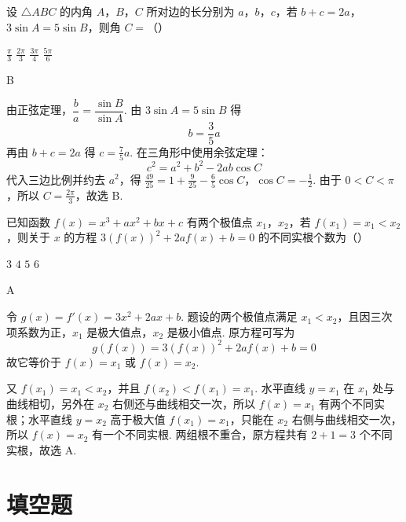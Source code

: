 \begin{problem}
设 \(\triangle ABC\) 的内角 \(A\)，\(B\)，\(C\) 所对边的长分别为 \(a\)，\(b\)，\(c\)，若 \(b + c = 2a\)，\(3\sin A = 5\sin B\)，则角 \(C =\)（\quad）

\choices
    {\( \frac{\pi}{3} \)}
    {\( \frac{2\pi}{3} \)}
    {\( \frac{3\pi}{4} \)}
    {\(\frac{5\pi}{6}\)}
\end{problem}

\begin{answer}
B
\end{answer}

\begin{solution}
由正弦定理，\(\dfrac{b}{a}=\dfrac{\sin B}{\sin A}\). 由 \(3\sin A=5\sin B\) 得
\[
b=\frac35a
\]
再由 \(b+c=2a\) 得 \(c=\frac75a\). 在三角形中使用余弦定理：
\[
c^2=a^2+b^2-2ab\cos C
\]
代入三边比例并约去 \(a^2\)，得
\(\frac{49}{25}=1+\frac9{25}-\frac65\cos C\)，\(\cos C=-\frac12\).
由于 \(0<C<\pi\)，所以 \(C=\frac{2\pi}{3}\)，故选 B.
\end{solution}

\begin{problem}
已知函数 \( f(x) = x^3 + ax^2 + bx + c \) 有两个极值点 \(x_1\)，\(x_2\)，若 \( f(x_1) = x_1 < x_2 \)，则关于 \( x \) 的方程 \( 3(f(x))^2 + 2af(x) + b = 0 \) 的不同实根个数为（\quad）

\choices
    {\(3\)}
    {\(4\)}
    {\(5\)}
    {\(6\)}
\end{problem}

\begin{answer}
A
\end{answer}

\begin{solution}
令 \(g(x)=f'(x)=3x^2+2ax+b\). 题设的两个极值点满足 \(x_1<x_2\)，且因三次项系数为正，\(x_1\) 是极大值点，\(x_2\) 是极小值点. 原方程可写为
\[
g(f(x))=3(f(x))^2+2af(x)+b=0
\]
故它等价于 \(f(x)=x_1\) 或 \(f(x)=x_2\).

又 \(f(x_1)=x_1<x_2\)，并且 \(f(x_2)<f(x_1)=x_1\). 水平直线 \(y=x_1\) 在 \(x_1\) 处与曲线相切，另外在 \(x_2\) 右侧还与曲线相交一次，所以 \(f(x)=x_1\) 有两个不同实根；水平直线 \(y=x_2\) 高于极大值 \(f(x_1)=x_1\)，只能在 \(x_2\) 右侧与曲线相交一次，所以 \(f(x)=x_2\) 有一个不同实根. 两组根不重合，原方程共有 \(2+1=3\) 个不同实根，故选 A.
\end{solution}

\section{填空题}

